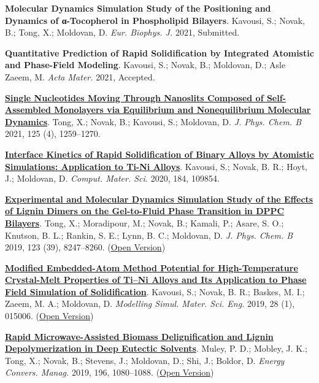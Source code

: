 \pagebreak


\begin{cventries}
  \cventry
    {} %
    {} %
    {} %
    {} %
    {
      \begin{cvitems} %
        \item {\textbf{Molecular Dynamics Simulation Study of the Positioning and Dynamics of α-Tocopherol in Phospholipid Bilayers}. Kavousi, S.; Novak, B.; Tong, X.; Moldovan, D. \textit{Eur. Biophys. J.} 2021, Submitted.}
        \item {\textbf{Quantitative Prediction of Rapid Solidification by Integrated Atomistic and Phase-Field Modeling}. Kavousi, S.; Novak, B.; Moldovan, D.; Asle Zaeem, M. \textit{Acta Mater.} 2021, Accepted.}
        \item {\href{https://doi.org/10.1021/acs.jpcb.0c07797}{\textbf{Single Nucleotides Moving Through Nanoslits Composed of Self-Assembled Monolayers via Equilibrium and Nonequilibrium Molecular Dynamics}}. Tong, X.; Novak, B.; Kavousi, S.; Moldovan, D. \textit{J. Phys. Chem. B} 2021, 125 (4), 1259–1270.}
        \item {\href{https://doi.org/10.1016/j.commatsci.2020.109854.}{\textbf{Interface Kinetics of Rapid Solidification of Binary Alloys by Atomistic Simulations: Application to Ti-Ni Alloys}}. Kavousi, S.; Novak, B. R.; Hoyt, J.; Moldovan, D. \textit{Comput. Mater. Sci.} 2020, 184, 109854.}
        \item {\href{https://doi.org/10.1021/acs.jpcb.9b05525}{\textbf{Experimental and Molecular Dynamics Simulation Study of the Effects of Lignin Dimers on the Gel-to-Fluid Phase Transition in DPPC Bilayers}}. Tong, X.; Moradipour, M.; Novak, B.; Kamali, P.; Asare, S. O.; Knutson, B. L.; Rankin, S. E.; Lynn, B. C.; Moldovan, D. \textit{J. Phys. Chem. B} 2019, 123 (39), 8247–8260. (\href{https://par.nsf.gov/servlets/purl/10149222}{Open Version})}
        \item {\href{https://doi.org/10.1088/1361-651X/ab580c}{\textbf{Modified Embedded-Atom Method Potential for High-Temperature Crystal-Melt Properties of Ti–Ni Alloys and Its Application to Phase Field Simulation of Solidification}}. Kavousi, S.; Novak, B. R.; Baskes, M. I.; Zaeem, M. A.; Moldovan, D. \textit{Modelling Simul. Mater. Sci. Eng.} 2019, 28 (1), 015006. (\href{https://par.nsf.gov/servlets/purl/10208355}{Open Version})}
        \item {\href{https://doi.org/10.1016/j.enconman.2019.06.070}{\textbf{Rapid Microwave-Assisted Biomass Delignification and Lignin Depolymerization in Deep Eutectic Solvents}}. Muley, P. D.; Mobley, J. K.; Tong, X.; Novak, B.; Stevens, J.; Moldovan, D.; Shi, J.; Boldor, D. \textit{Energy Convers. Manag.} 2019, 196, 1080–1088. (\href{https://www.sciencedirect.com/science/article/am/pii/S0196890419307411}{Open Version})}

\end{cvitems}}
\end{cventries}
